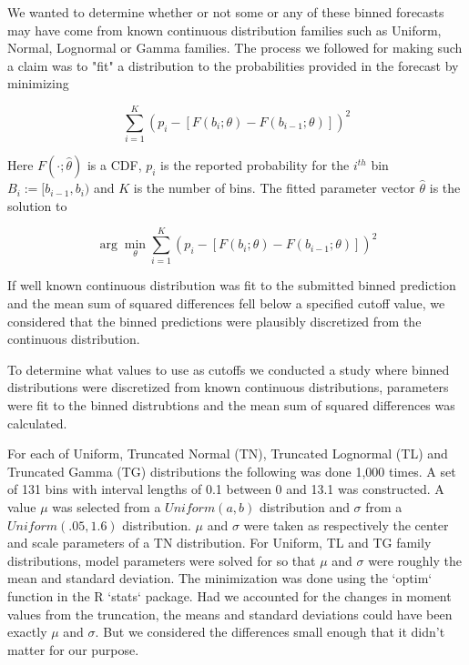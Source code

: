 \documentclass{article}\usepackage[]{graphicx}\usepackage[]{color}
\begin{document}
We wanted to determine whether or not some or any of these binned forecasts may
have come from known continuous distribution families such as Uniform, Normal, 
Lognormal or Gamma families. The process we followed for making such a claim was
to "fit" a distribution to the probabilities provided in the forecast by
minimizing

\begin{equation}
  \sum_{i=1}^K (p_i - [F(b_i; \theta) - F(b_{i-1}; \theta)])^2
\end{equation}

Here $F(\cdot; \hat{\theta})$ is a CDF, $p_i$ is the reported probability for 
the $i^{th}$ bin $B_i := [b_{i-1}, b_i)$ and $K$ is the number of bins.
The fitted parameter vector $\hat{\theta}$ is the solution to 

\begin{equation}
\arg\min_{\theta}\sum_{i=1}^K (p_i - 
[F(b_i; \theta) - F(b_{i-1}; \theta)])^2
\end{equation}

If well known continuous distribution was fit to the submitted binned prediction
and the mean sum of squared differences fell below a specified cutoff value, we
considered that the binned predictions were plausibly discretized from the 
continuous distribution.


To determine what values to use as cutoffs we conducted a study where 
binned distributions were discretized from known continuous distributions, 
parameters were fit to the binned distrubtions and the mean sum of squared 
differences was calculated.

For each of Uniform, Truncated Normal (TN), Truncated Lognormal (TL) and 
Truncated Gamma (TG) distributions the following was
done 1,000 times. A set of 131 bins with interval lengths of 
0.1 between 0 and 13.1 was constructed. 
A value $\mu$ was selected from a $Uniform(a,b)$ distribution and $\sigma$ from 
a $Uniform(.05,1.6)$ distribution. $\mu$ and $\sigma$ were taken as respectively 
the center and scale parameters of a TN distribution. 
For Uniform, TL and TG family
distributions, model parameters were solved for so that $\mu$ and $\sigma$ 
were roughly the mean and standard deviation. The minimization was done using 
the `optim` function in the R `stats` package.
Had we accounted for the changes
in moment values from the truncation, the means and standard deviations could 
have been exactly $\mu$ and $\sigma$. But we considered the differences small 
enough that it didn't matter for our purpose.
\end{document}
